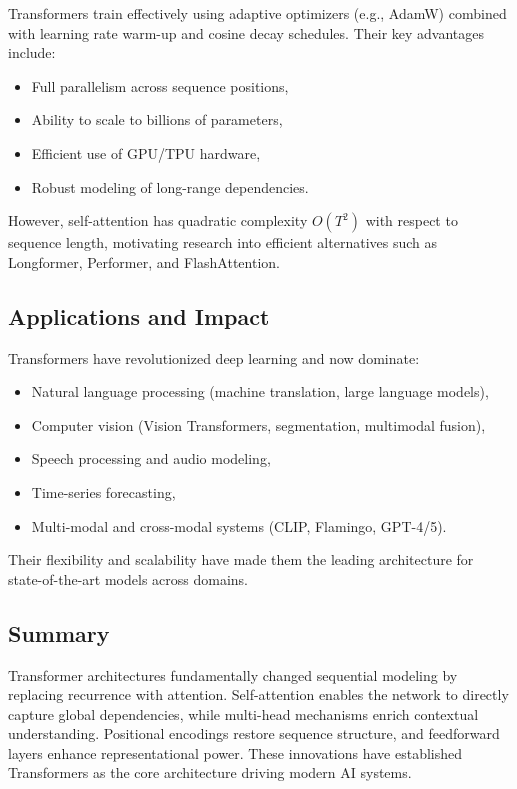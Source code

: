 \documentclass[12pt,a4paper]{report}
\begin{document}
Transformers train effectively using adaptive optimizers (e.g., AdamW) combined with learning rate warm-up and cosine decay schedules.  
Their key advantages include:
\begin{itemize}
    \item Full parallelism across sequence positions,
    \item Ability to scale to billions of parameters,
    \item Efficient use of GPU/TPU hardware,
    \item Robust modeling of long-range dependencies.
\end{itemize}

However, self-attention has quadratic complexity $O(T^2)$ with respect to sequence length, motivating research into efficient alternatives such as Longformer, Performer, and FlashAttention.

\vspace{1em}
\subsection{Applications and Impact}

Transformers have revolutionized deep learning and now dominate:
\begin{itemize}
    \item Natural language processing (machine translation, large language models),
    \item Computer vision (Vision Transformers, segmentation, multimodal fusion),
    \item Speech processing and audio modeling,
    \item Time-series forecasting,
    \item Multi-modal and cross-modal systems (CLIP, Flamingo, GPT-4/5).
\end{itemize}

Their flexibility and scalability have made them the leading architecture for state-of-the-art models across domains.

\vspace{1em}
\subsection{Summary}

Transformer architectures fundamentally changed sequential modeling by replacing recurrence with attention.  
Self-attention enables the network to directly capture global dependencies, while multi-head mechanisms enrich contextual understanding.  
Positional encodings restore sequence structure, and feedforward layers enhance representational power.  
These innovations have established Transformers as the core architecture driving modern AI systems.
\end{document}
